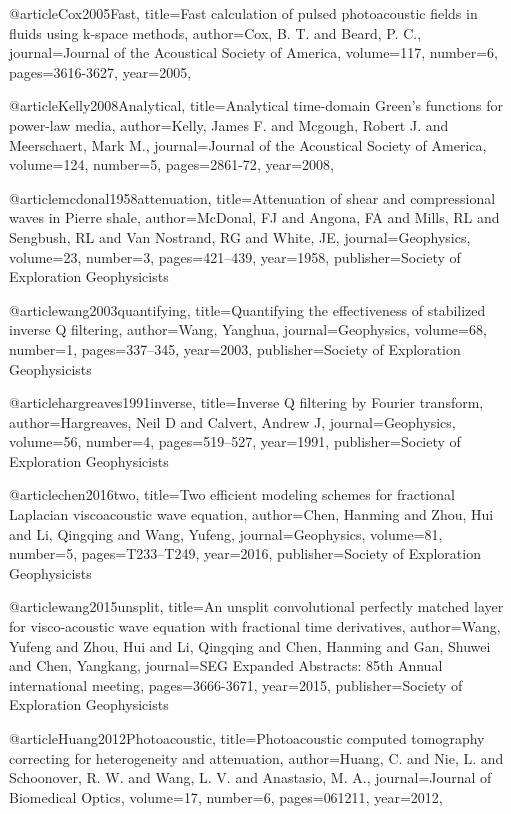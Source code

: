 {@article{Cox2005Fast,
  title={Fast calculation of pulsed photoacoustic fields in fluids using k-space methods},
  author={Cox, B. T. and Beard, P. C.},
  journal={Journal of the Acoustical Society of America},
  volume={117},
  number={6},
  pages={3616-3627},
  year={2005},
}

@article{Kelly2008Analytical,
  title={Analytical time-domain Green's functions for power-law media},
  author={Kelly, James F. and Mcgough, Robert J. and Meerschaert, Mark M.},
  journal={Journal of the Acoustical Society of America},
  volume={124},
  number={5},
  pages={2861-72},
  year={2008},
}

@article{mcdonal1958attenuation,
  title={Attenuation of shear and compressional waves in Pierre shale},
  author={McDonal, FJ and Angona, FA and Mills, RL and Sengbush, RL and Van Nostrand, RG and White, JE},
  journal={Geophysics},
  volume={23},
  number={3},
  pages={421--439},
  year={1958},
  publisher={Society of Exploration Geophysicists}
}

@article{wang2003quantifying,
  title={Quantifying the effectiveness of stabilized inverse {Q} filtering},
  author={Wang, Yanghua},
  journal={Geophysics},
  volume={68},
  number={1},
  pages={337--345},
  year={2003},
  publisher={Society of Exploration Geophysicists}
}

@article{hargreaves1991inverse,
  title={Inverse {Q} filtering by {F}ourier transform},
  author={Hargreaves, Neil D and Calvert, Andrew J},
  journal={Geophysics},
  volume={56},
  number={4},
  pages={519--527},
  year={1991},
  publisher={Society of Exploration Geophysicists}
}

@article{chen2016two,
  title={Two efficient modeling schemes for fractional {L}aplacian viscoacoustic wave equation},
  author={Chen, Hanming and Zhou, Hui and Li, Qingqing and Wang, Yufeng},
  journal={Geophysics},
  volume={81},
  number={5},
  pages={T233--T249},
  year={2016},
  publisher={Society of Exploration Geophysicists}
}

@article{wang2015unsplit,
  title={An unsplit convolutional perfectly matched layer for visco-acoustic wave equation with fractional time derivatives},
  author={Wang, Yufeng and Zhou, Hui and Li, Qingqing and Chen, Hanming and Gan, Shuwei and Chen, Yangkang},
  journal={SEG Expanded Abstracts: 85th Annual international meeting},
  pages={3666-3671},
  year={2015},
  publisher={Society of Exploration Geophysicists}
}

@article{Huang2012Photoacoustic,
  title={Photoacoustic computed tomography correcting for heterogeneity and attenuation},
  author={Huang, C. and Nie, L. and Schoonover, R. W. and Wang, L. V. and Anastasio, M. A.},
  journal={Journal of Biomedical Optics},
  volume={17},
  number={6},
  pages={061211},
  year={2012},
}

}
